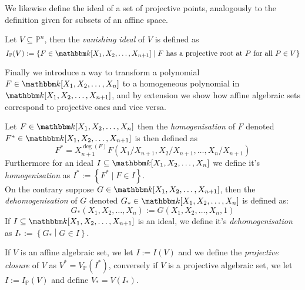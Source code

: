 \newpage
We likewise define the ideal of a set of projective points, analogously to the definition given for subsets of an affine space.

\begin{definition}\label{def:projective_ideal}
  Let $V \subseteq \mathbb{P}^{n}$, then the \textit{vanishing ideal} of $V$ is defined as
  \begin{equation*}
    I_{\mathbb{P}}(V) := \left\{F \in \K[X_1, X_2, \ldots, X_{n+1}] \mid F \text{ has a projective root at } P \text{ for all } P \in V \right\}
  \end{equation*}
\end{definition}

Finally we introduce a way to transform a polynomial $F \in \K[X_1, X_2, \ldots, X_{n}]$ to a homogeneous polynomial in $\K[X_1, X_2, \ldots, X_{n + 1}]$, and by extension we show how affine algebraic sets correspond to projective ones and vice versa.
\begin{definition}
  Let $F \in \K[X_1, X_2, \ldots, X_{n}]$ then the \textit{homogenisation} of $F$ denoted $F^{*} \in \K[X_1, X_2, \ldots, X_{n +1}]$ is then defined as
  \begin{equation*}
    F^{*} = X_{n + 1}^{\deg(F)} F(X_{1} / X_{n + 1}, X_{2} / X_{n + 1}, \ldots, X_{n} / X_{n + 1})
  \end{equation*}
  Furthermore for an ideal $I \subseteq \K[X_1, X_2, \ldots, X_{n}]$ we define it's \textit{homogenisation} as $I^{*} := \left\{F^* \mid F \in I\right\}$. \\
  On the contrary suppose $G \in \K[X_1, X_2, \ldots, X_{n + 1}]$, then the \textit{dehomogenisation} of $G$ denoted $G_{*} \in \K[X_1, X_2, \ldots, X_{n}]$ is defined as:
  \begin{equation*}
    G_{*}(X_1, X_2, \ldots, X_{n}) := G(X_1, X_2, \ldots, X_{n}, 1)
  \end{equation*}
  If $I \subseteq \K[X_1, X_2, \ldots, X_{n + 1}]$ is an ideal, we define it's \textit{dehomogenisation} as $I_{*} := \left\{G_{*} \middle| G \in I\right\}$.
\end{definition}
 If $V$ is an affine algebraic set, we let $I := I(V)$ and we define the \textit{projective closure} of $V$ as
 $V^{*} = V_{\mathbb{P}}(I^{*})$, conversely if $V$ is a projective algebraic set, we let $I := I_{\mathbb{P}}(V)$ and define $V_{*} = V(I_{*})$.


